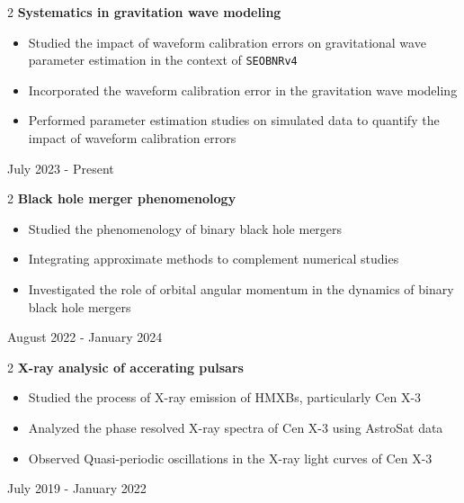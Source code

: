 \documentclass[10pt, letterpaper]{article}
\newenvironment{highlights}{
    \begin{itemize}[
        topsep=0.10 cm,
        parsep=0.10 cm,
        partopsep=0pt,
        itemsep=0pt,
        leftmargin=0.4 cm + 10pt
    ]
}{
    \end{itemize}
}
\newenvironment{twocolentry}[2][]{
    \onecolentry
    \def\secondColumn{#2}
    \setcolumnwidth{\fill, 4.5 cm}
    \begin{paracol}{2}
}{
    \switchcolumn \raggedleft \secondColumn
    \end{paracol}
    \endonecolentry
}
\begin{document}
\vspace{0.2 cm}

\begin{twocolentry}{July 2023 - Present}{\textbf{Systematics in gravitation wave modeling}}
    \begin{highlights}
        \item Studied the impact of waveform calibration errors on gravitational wave parameter estimation in the context of \texttt{SEOBNRv4}
        \item Incorporated the waveform calibration error in the gravitation wave modeling
        \item Performed parameter estimation studies on simulated data to quantify the impact of waveform calibration errors
    \end{highlights}
\end{twocolentry}

\vspace{0.2 cm}

\begin{twocolentry}{August 2022 - January 2024}{\textbf{Black hole merger phenomenology}}
    \begin{highlights}
        \item Studied the phenomenology of binary black hole mergers
        \item Integrating approximate methods to complement numerical studies
        \item Investigated the role of orbital angular momentum in the dynamics of binary black hole mergers
    \end{highlights}
\end{twocolentry}

\vspace{0.2 cm}
\begin{twocolentry}{July 2019 - January 2022}{\textbf{X-ray analysic of accerating pulsars}}
    \begin{highlights}
        \item Studied the process of X-ray emission of HMXBs, particularly Cen X-3
        \item Analyzed the phase resolved X-ray spectra of Cen X-3 using AstroSat data
        \item Observed Quasi-periodic oscillations in the X-ray light curves of Cen X-3
    \end{highlights}
\end{twocolentry}

\end{document}
